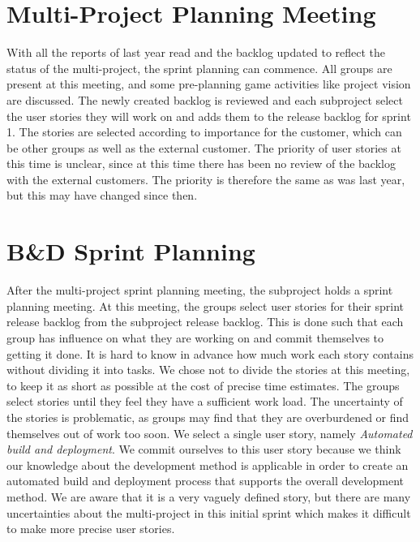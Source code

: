 \section{Multi-Project Planning Meeting}\label{sec:s1p_multiproject}
With all the reports of last year read and the backlog updated to reflect the status of the multi-project, the sprint planning can commence. All groups are present at this meeting, and some pre-planning game activities like project vision are discussed. The newly created backlog is reviewed and each subproject select the user stories they will work on and adds them to the release backlog for sprint 1. The stories are selected according to importance for the customer, which can be other groups as well as the external customer. The priority of user stories at this time is unclear, since at this time there has been no review of the backlog with the external customers. The priority is therefore the same as was last year, but this may have changed since then.

\section{B\&D Sprint Planning}\label{sec:s1p_bd}
After the multi-project sprint planning meeting, the \bd subproject holds a sprint planning meeting. At this meeting, the \bd groups select user stories for their sprint release backlog from the \bd subproject release backlog. This is done such that each group has influence on what they are working on and commit themselves to getting it done. It is hard to know in advance how much work each story contains without dividing it into tasks. We chose not to divide the stories at this meeting, to keep it as short as possible at the cost of precise time estimates. The groups select stories until they feel they have a sufficient work load. The uncertainty of the stories is problematic, as groups may find that they are overburdened or find themselves out of work too soon. We select a single user story, namely \emph{Automated build and deployment}. We commit ourselves to this user story because we think our knowledge about the development method is applicable in order to create an automated build and deployment process that supports the overall development method. We are aware that it is a very vaguely defined story, but there are many uncertainties about the multi-project in this initial sprint which makes it difficult to make more precise user stories.

